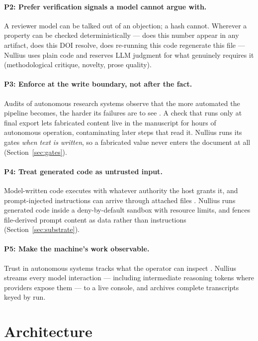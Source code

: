 \documentclass[11pt]{article}
\begin{document}
\paragraph{P2: Prefer verification signals a model cannot argue with.}
A reviewer model can be talked out of an objection; a hash cannot. Wherever a property can be checked deterministically --- does this number appear in any artifact, does this DOI resolve, does re-running this code regenerate this file --- Nullius uses plain code and reserves LLM judgment for what genuinely requires it (methodological critique, novelty, prose quality).

\paragraph{P3: Enforce at the write boundary, not after the fact.}
Audits of autonomous research systems observe that the more automated the pipeline becomes, the harder its failures are to see \cite{beel2025}. A check that runs only at final export lets fabricated content live in the manuscript for hours of autonomous operation, contaminating later steps that read it. Nullius runs its gates \emph{when text is written}, so a fabricated value never enters the document at all (Section~\ref{sec:gates}).

\paragraph{P4: Treat generated code as untrusted input.}
Model-written code executes with whatever authority the host grants it, and prompt-injected instructions can arrive through attached files \cite{sandbox-eval}. Nullius runs generated code inside a deny-by-default sandbox with resource limits, and fences file-derived prompt content as data rather than instructions (Section~\ref{sec:substrate}).

\paragraph{P5: Make the machine's work observable.}
Trust in autonomous systems tracks what the operator can inspect \cite{anthropic-agents}. Nullius streams every model interaction --- including intermediate reasoning tokens where providers expose them --- to a live console, and archives complete transcripts keyed by run.

\section{Architecture}
\label{sec:arch}
\end{document}

